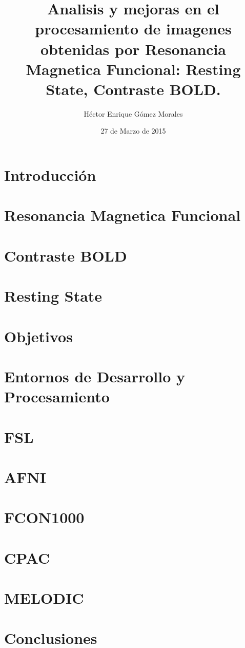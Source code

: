 \documentclass{article}
\author{Héctor Enrique Gómez Morales}
\title{
  Analisis y mejoras en el procesamiento de imagenes obtenidas por Resonancia Magnetica Funcional: Resting State, Contraste BOLD. }
\date{27 de Marzo de 2015}
\begin{document}
\maketitle
\section{Introducción}

\section{Resonancia Magnetica Funcional}

\section{Contraste BOLD}

\section{Resting State}

\section{Objetivos}

\section{Entornos de Desarrollo y Procesamiento}

\section{FSL}

\section{AFNI}

\section{FCON1000}

\section{CPAC}

\section{MELODIC}

\section{Conclusiones}
\end{document}
